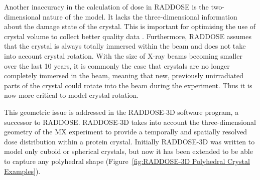         Another inaccuracy in the calculation of dose in RADDOSE is the two-dimensional nature of the model. It lacks the three-dimensional information about the damage state of the crystal.
        This is important for optimising the use of crystal volume to collect better quality data \cite{zeldin2012,zeldin2013dwd}.
        Furthermore, RADDOSE assumes that the crystal is always totally immersed within the beam and does not take into account crystal rotation.
        With the size of X-ray beams becoming smaller over the last 10 years, it is commonly the case that crystals are no longer completely immersed in the beam, meaning that new, previously unirradiated parts of the crystal could rotate into the beam during the experiment.
        Thus it is now more critical to model crystal rotation.

        This geometric issue is addressed in the RADDOSE-3D \cite{zeldin2013} software program, a successor to RADDOSE.
        RADDOSE-3D takes into account the three-dimensional geometry of the MX experiment to provide a temporally and spatially resolved dose distribution within a protein crystal.
        Initially RADDOSE-3D was written to model only cuboid or spherical crystals, but now it has been extended to be able to capture any polyhedral shape (Figure~\ref{fig:RADDOSE-3D Polyhedral Crystal Examples}).

